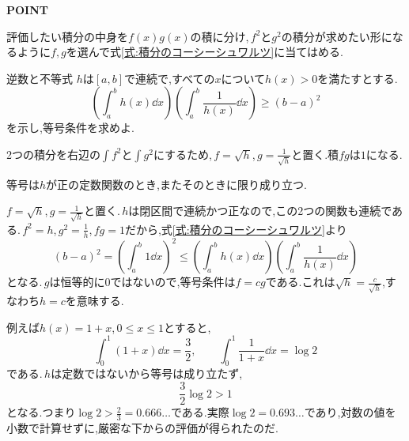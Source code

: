 \begin{bookpoint}
\textbf{POINT}\par
評価したい積分の中身を$f(x)g(x)$の積に分け,\,$f^2$と$g^2$の積分が求めたい形になるように$f,g$を選んで式\eqref{式:積分のコーシーシュワルツ}に当てはめる.
\end{bookpoint}

\begin{example}{逆数と不等式}
$h$は$[a,b]$で連続で,すべての$x$について$h(x)>0$を満たすとする.
\[
 \left(\int_a^b h(x)\dd x\right)
 \left(\int_a^b\frac1{h(x)}\dd x\right)
 \ge(b-a)^2
\]
を示し,等号条件を求めよ.
\end{example}

2つの積分を右辺の$\int f^2$と$\int g^2$にするため,\,$f=\sqrt h$,\,$g=\frac1{\sqrt h}$と置く.積$fg$は$1$になる.

等号は$h$が正の定数関数のとき,またそのときに限り成り立つ.

$f=\sqrt h$,\,$g=\frac1{\sqrt h}$と置く.\,$h$は閉区間で連続かつ正なので,この2つの関数も連続である.\,$f^2=h$,\,$g^2=\frac1h$,\,$fg=1$だから,式\eqref{式:積分のコーシーシュワルツ}より
\[
 (b-a)^2
 =\left(\int_a^b1\dd x\right)^2
 \le\left(\int_a^b h(x)\dd x\right)
       \left(\int_a^b\frac1{h(x)}\dd x\right)
\]
となる.\,$g$は恒等的に$0$ではないので,等号条件は$f=cg$である.これは$\sqrt h=\frac c{\sqrt h}$,すなわち$h=c$を意味する.

例えば$h(x)=1+x$,\,$0\le x\le1$とすると,
\[
 \int_0^1(1+x)\dd x=\frac32,\qquad
 \int_0^1\frac1{1+x}\dd x=\log2
\]
である.\,$h$は定数ではないから等号は成り立たず,
\[
 \frac32\log2>1
\]
となる.つまり$\log2>\frac23=0.666\ldots$である.実際$\log2=0.693\ldots$であり,対数の値を小数で計算せずに,厳密な下からの評価が得られたのだ.
